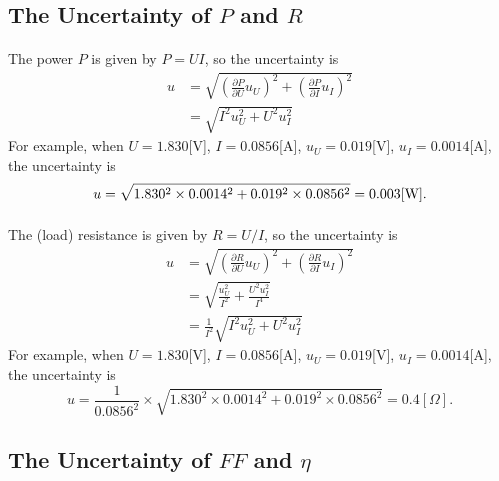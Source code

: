 \documentclass[a4paper]{article}
\begin{document}
    \subsection{The Uncertainty of $P$ and $R$}
    \paragraph{} The power $P$ is given by $P=UI$, so the uncertainty is 
    \begin{equation*}
        \begin{split}
            u&=\sqrt{\left(\frac{\partial P}{\partial U}u_U\right)^2+\left(\frac{\partial P}{\partial I}u_I\right)^2}\\
            &=\sqrt{I^2u_U^2+U^2u_I^2}
        \end{split}
    \end{equation*} 
    For example, when $U=1.830$[V], $I=0.0856$[A], $u_U=0.019$[V], $u_I=0.0014$[A], the uncertainty is $$u=\sqrt{1.830^2\times 0.0014^2+0.019^2\times 0.0856^2}=0.003[\rm W].$$
    \vspace{-5mm}
    \paragraph{} The (load) resistance is given by $R=U/I$, so the uncertainty is 
    \begin{equation*}
        \begin{split}
            u&=\sqrt{\left(\frac{\partial R}{\partial U}u_U\right)^2+\left(\frac{\partial R}{\partial I}u_I\right)^2}\\
            &=\sqrt{\frac{u_U^2}{I^2}+\frac{U^2u_I^2}{I^4}}\\
            &=\frac{1}{I^2}\sqrt{I^2u_U^2+U^2u_I^2}
        \end{split}
    \end{equation*}
    For example, when $U=1.830$[V], $I=0.0856$[A], $u_U=0.019$[V], $u_I=0.0014$[A], the uncertainty is $$u=\frac{1}{0.0856^2}\times \sqrt{1.830^2\times 0.0014^2+0.019^2\times 0.0856^2}=0.4[\Omega].$$
    \subsection{The Uncertainty of $FF$ and $\eta$}
\end{document}
